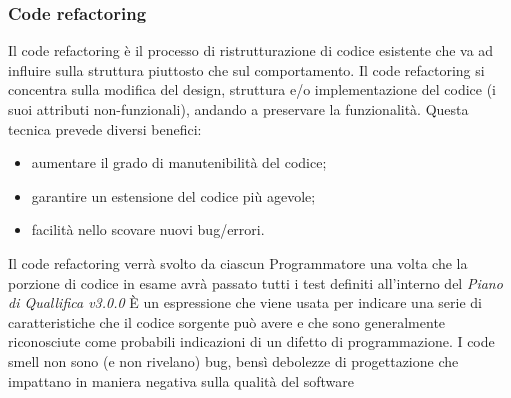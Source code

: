 		
		\subsubsection{Code refactoring}
		Il code refactoring è il processo di ristrutturazione di codice esistente che va ad influire sulla struttura piuttosto che sul comportamento. Il code refactoring si concentra sulla
		modifica del design, struttura e/o implementazione del codice (i suoi attributi non-funzionali), andando a preservare la funzionalità.
		Questa tecnica prevede diversi benefici:
		\begin{itemize}
			\item aumentare il grado di manutenibilità del codice;
			\item garantire un estensione del codice più agevole;
			\item facilità nello scovare nuovi bug/errori.
		\end{itemize}
		Il code refactoring verrà svolto da ciascun Programmatore una volta che la porzione di 
		codice in esame avrà passato tutti i test definiti all'interno del \textit{Piano di Quallifica v3.0.0}
			È un espressione che viene usata per indicare una serie di caratteristiche che il 
			codice sorgente può avere e che sono generalmente riconosciute come probabili indicazioni di un difetto di programmazione.
			I code smell non sono (e non rivelano) bug, bensì debolezze di progettazione
			che impattano in maniera negativa sulla qualità del software
		
